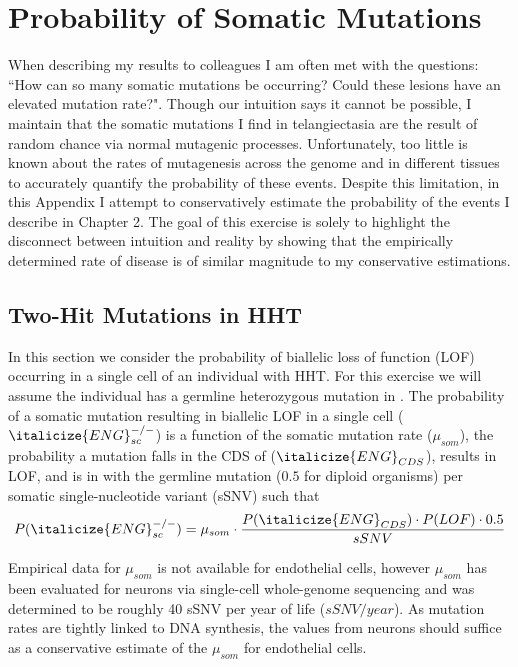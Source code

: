 \chapter{Probability of Somatic Mutations}
\clearpage

When describing my results to colleagues I am often met with the questions: ``How can so many somatic mutations be occurring? Could these lesions have an elevated mutation rate?". Though our intuition says it cannot be possible, I maintain that the somatic mutations I find in telangiectasia are the result of random chance via normal mutagenic processes. Unfortunately, too little is known about the rates of mutagenesis across the genome and in different tissues to accurately quantify the probability of these events. Despite this limitation, in this Appendix I attempt to conservatively estimate the probability of the events I describe in Chapter 2. The goal of this exercise is solely to highlight the disconnect between intuition and reality by showing that the empirically determined rate of disease is of similar magnitude to my conservative estimations. 



\section{Two-Hit Mutations in HHT}
In this section we consider the probability of biallelic loss of function (LOF) occurring in a single cell of an individual with HHT. For this exercise we will assume the individual has a germline heterozygous mutation in . The probability of a somatic mutation resulting in biallelic LOF in a single cell ($\italicize{ENG}_{sc}^{-/-}$) is a function of the somatic mutation rate ($\mu_{som}$), the probability a mutation falls in the CDS of  ($\italicize{ENG}_{CDS}$), results in LOF, and is in  with the germline mutation ($0.5$ for diploid organisms) per somatic single-nucleotide variant (sSNV) such that
\begin{equation*}
P(\italicize{ENG}_{sc}^{-/-}) = \mu_{som} \cdot \frac{P(\italicize{ENG}_{CDS}) \cdot P(LOF) \cdot 0.5}{sSNV}
\end{equation*}

Empirical data for $\mu_{som}$ is not available for endothelial cells, however $\mu_{som}$ has been evaluated for neurons via single-cell whole-genome sequencing \citep{lodato2018} and was determined to be roughly 40 sSNV per year of life ($sSNV/year$). As mutation rates are tightly linked to DNA synthesis, the values from neurons should suffice as a conservative estimate of the $\mu_{som}$ for endothelial cells. 

